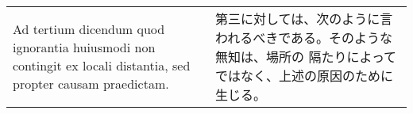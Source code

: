 \documentclass[10pt]{jsarticle} %
\begin{document}
\begin{longtable}{p{21em}p{21em}}
\\




{\sc Ad tertium dicendum} quod ignorantia huiusmodi non contingit ex
locali distantia, sed propter causam praedictam.


&

第三に対しては、次のように言われるべきである。そのような無知は、場所の
隔たりによってではなく、上述の原因のために生じる。

\end{longtable}
\end{document}
